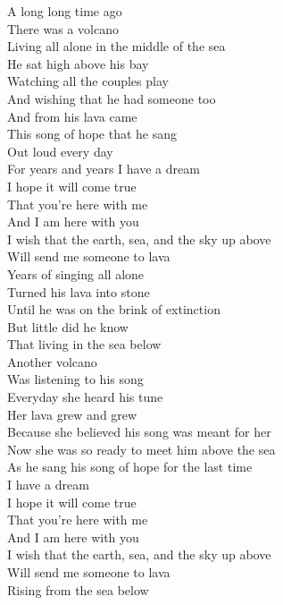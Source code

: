 
A long long time ago\\
There was a volcano\\
Living all alone in the middle of the sea\\
He sat high above his bay\\
Watching all the couples play\\
And wishing that he had someone too\\
And from his lava came\\
This song of hope that he sang \\
Out loud every day\\
For years and years
\hops
{} I have a dream\\
 I hope it will come true\\
 That you're here with me\\
 And I am here with you\\
 I wish that the earth, sea, and the sky up above\\
 Will send me someone to lava\\
\hops
Years of singing all alone\\
Turned his lava into stone\\
Until he was on the brink of extinction\\
But little did he know\\
That living in the sea below\\
Another volcano\\
Was listening to his song\\
Everyday she heard his tune\\
Her lava grew and grew\\
Because she believed his song was meant for her\\
Now she was so ready to meet him above the sea\\
As he sang his song of hope for the last time\\
\hops
{} I have a dream\\
 I hope it will come true\\
 That you're here with me\\
 And I am here with you\\
 I wish that the earth, sea, and the sky up above\\
 Will send me someone to lava\\
\hops
Rising from the sea below\\
